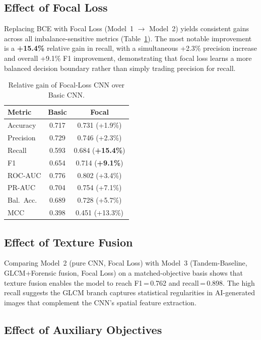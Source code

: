 \documentclass[10pt,twocolumn]{article}
\begin{document}
\subsection{Effect of Focal Loss}

Replacing BCE with Focal Loss (Model~1 $\to$ Model~2) yields
consistent gains across all imbalance-sensitive metrics
(Table~\ref{tab:focal_gain}).
The most notable improvement is a \textbf{+15.4\%} relative gain in
recall, with a simultaneous +2.3\% precision increase and overall
+9.1\% F1 improvement, demonstrating that focal loss learns a
more balanced decision boundary rather than simply trading
precision for recall.

\begin{table}[h]
\centering
\caption{Relative gain of Focal-Loss CNN over Basic CNN.}
\label{tab:focal_gain}
\small
\begin{tabular}{lcc}
\toprule
\textbf{Metric} & \textbf{Basic} & \textbf{Focal} \\
\midrule
Accuracy   & 0.717 & 0.731 \;(+1.9\%) \\
Precision  & 0.729 & 0.746 \;(+2.3\%) \\
Recall     & 0.593 & 0.684 \;(\textbf{+15.4\%}) \\
F1         & 0.654 & 0.714 \;(\textbf{+9.1\%}) \\
ROC-AUC    & 0.776 & 0.802 \;(+3.4\%) \\
PR-AUC     & 0.704 & 0.754 \;(+7.1\%) \\
Bal.\ Acc.\ & 0.689 & 0.728 \;(+5.7\%) \\
MCC        & 0.398 & 0.451 \;(+13.3\%) \\
\bottomrule
\end{tabular}
\end{table}

\subsection{Effect of Texture Fusion}

Comparing Model~2 (pure CNN, Focal Loss) with Model~3
(Tandem-Baseline, GLCM+Forensic fusion, Focal Loss) on a
matched-objective basis shows that texture fusion enables the model
to reach F1\,=\,0.762 and recall\,=\,0.898.
The high recall suggests the GLCM branch captures statistical
regularities in AI-generated images that complement the CNN's
spatial feature extraction.

\subsection{Effect of Auxiliary Objectives}
\end{document}
